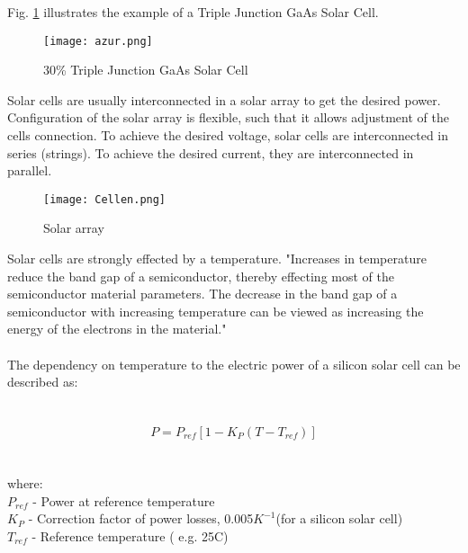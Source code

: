 Fig. \ref{fig: GaAs} illustrates the example of a Triple Junction GaAs Solar Cell.

\begin{figure}[h]
	\centering
	\texttt{[image: azur.png]}
	\caption{ 30\% Triple Junction GaAs Solar Cell \cite{4}}
	\label{fig: GaAs}
\end{figure}

Solar cells are usually interconnected in a solar array to get the desired power. Configuration of the solar array is flexible, such that it allows adjustment of the cells connection. To achieve the desired voltage, solar cells are interconnected in series (strings). To achieve the desired current, they are interconnected in parallel.\\

\newpage

\begin{figure}[h]
	\centering
	\texttt{[image: Cellen.png]}
	\caption{ Solar array}
	\label{array}
\end{figure}
	
Solar cells are strongly effected by a temperature. \cite{5} "Increases in temperature reduce the band gap of a semiconductor, thereby effecting most of the semiconductor material parameters. The decrease in the band gap of a semiconductor with increasing temperature can be viewed as increasing the energy of the electrons in the material."\\
\\
 The dependency on temperature to the electric power of a silicon solar cell can be described as\cite{6}:\\ \\ \\

\begin{equation}
P = P_{ref} [ 1 - K_{P} ( T - T_{ref}) ]
\end{equation}
	\\
	\\
where:\\
     $P_{ref}$ - Power at reference temperature\\
     $K_{P}$ - Correction factor of power losses, 0.005$K^{-1}$(for a silicon solar cell)\\
     $T_{ref}$ - Reference temperature ( e.g. 25\textdegree{}C)\\
     
     

